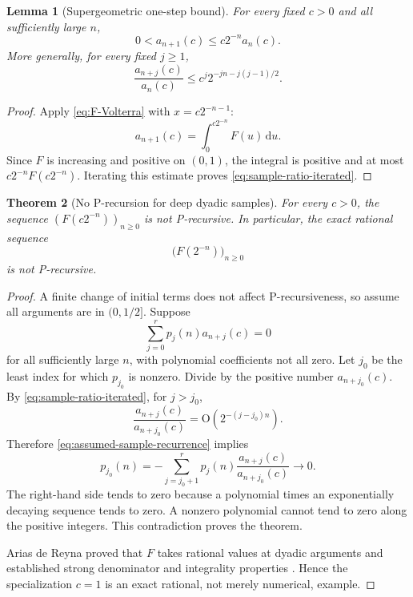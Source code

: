 \documentclass[11pt]{article}
\numberwithin{equation}{section}
\newtheorem{theorem}{Theorem}[section]
\newtheorem{lemma}[theorem]{Lemma}
\theoremstyle{definition}
\theoremstyle{remark}
\newcommand{\dd}{\,\mathrm d}
\newcommand{\Oh}{\mathrm O}
\begin{document}
\begin{lemma}[Supergeometric one-step bound]
\label{lem:sample-ratio}
For every fixed $c>0$ and all sufficiently large $n$,
\begin{equation}
 0<a_{n+1}(c)\le c2^{-n}a_n(c).
 \label{eq:sample-ratio}
\end{equation}
More generally, for every fixed $j\ge1$,
\begin{equation}
 \frac{a_{n+j}(c)}{a_n(c)}
 \le c^j2^{-jn-j(j-1)/2}.
 \label{eq:sample-ratio-iterated}
\end{equation}
\end{lemma}
\begin{proof}
Apply \eqref{eq:F-Volterra} with $x=c2^{-n-1}$:
\[
 a_{n+1}(c)=\int_0^{c2^{-n}}F(u)\dd u.
\]
Since $F$ is increasing and positive on $(0,1)$, the integral is positive and
at most $c2^{-n}F(c2^{-n})$.  Iterating this estimate proves
\eqref{eq:sample-ratio-iterated}.
\end{proof}

\begin{theorem}[No P-recursion for deep dyadic samples]
\label{thm:deep-samples-not-P}
For every $c>0$, the sequence $(F(c2^{-n}))_{n\ge0}$ is not P-recursive.  In
particular, the exact rational sequence
\begin{equation}
 \boxed{\bigl(F(2^{-n})\bigr)_{n\ge0}}
 \label{eq:exact-dyadic-sequence}
\end{equation}
is not P-recursive.
\end{theorem}
\begin{proof}
A finite change of initial terms does not affect P-recursiveness, so assume all
arguments are in $(0,1/2]$.  Suppose
\begin{equation}
 \sum_{j=0}^{r}p_j(n)a_{n+j}(c)=0
 \label{eq:assumed-sample-recurrence}
\end{equation}
for all sufficiently large $n$, with polynomial coefficients not all zero.
Let $j_0$ be the least index for which $p_{j_0}$ is nonzero.  Divide by the
positive number $a_{n+j_0}(c)$.  By
\eqref{eq:sample-ratio-iterated}, for $j>j_0$,
\begin{equation}
 \frac{a_{n+j}(c)}{a_{n+j_0}(c)}
 =\Oh\!\left(2^{-(j-j_0)n}\right).
 \label{eq:later-samples-small}
\end{equation}
Therefore \eqref{eq:assumed-sample-recurrence} implies
\begin{equation}
 p_{j_0}(n)=
 -\sum_{j=j_0+1}^{r}p_j(n)
   \frac{a_{n+j}(c)}{a_{n+j_0}(c)}
 \longrightarrow0.
 \label{eq:polynomial-to-zero}
\end{equation}
The right-hand side tends to zero because a polynomial times an exponentially
decaying sequence tends to zero.  A nonzero polynomial cannot tend to zero
along the positive integers.  This contradiction proves the theorem.

Arias de Reyna proved that $F$ takes rational values at dyadic arguments and
established strong denominator and integrality properties
\cite{AriasDefinition,AriasArithmetic}.  Hence the specialization $c=1$ is an
exact rational, not merely numerical, example.
\end{proof}
\end{document}
